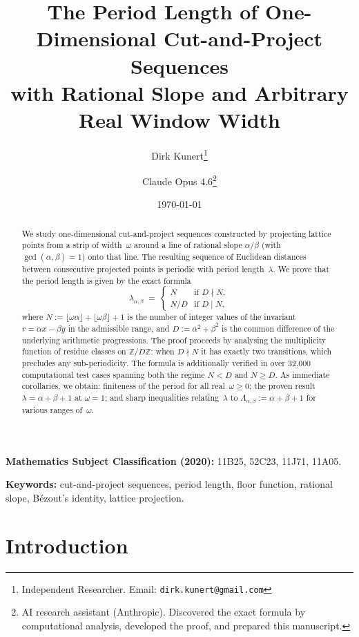 \documentclass[11pt]{article}
\title{The Period Length of One-Dimensional Cut-and-Project Sequences\\
with Rational Slope and Arbitrary Real Window Width}
\author{
    Dirk Kunert\thanks{Independent Researcher. Email: \texttt{dirk.kunert@gmail.com}}
    \and
    Claude Opus 4.6\thanks{AI research assistant (Anthropic). Discovered the exact
    formula by computational analysis, developed the proof,
    and prepared this manuscript.}
}
\date{\today}
\theoremstyle{plain}
\theoremstyle{definition}
\theoremstyle{remark}
\begin{document}
\maketitle

\begin{abstract}
We study one-dimensional cut-and-project sequences constructed by projecting
lattice points from a strip of width~$\omega$ around a line of rational slope
$\alpha/\beta$ (with $\gcd(\alpha,\beta)=1$) onto that line.
The resulting sequence of Euclidean distances between consecutive projected
points is periodic with period length~$\lambda$.
We prove that the period length is given by the exact formula
\[
    \lambda_{\alpha,\beta} \;=\;
    \begin{cases}
        N & \text{if } D \nmid N, \\[3pt]
        N / D & \text{if } D \mid N,
    \end{cases}
\]
where $N := \lfloor\omega\alpha\rfloor + \lfloor\omega\beta\rfloor + 1$ is
the number of integer values of the invariant $r = \alpha x - \beta y$ in the
admissible range, and $D := \alpha^2 + \beta^2$ is the common difference of
the underlying arithmetic progressions.
The proof proceeds by analysing the multiplicity function of residue
classes on $\mathbb{Z}/D\mathbb{Z}$: when $D \nmid N$ it has exactly two
transitions, which precludes any sub-periodicity.
The formula is additionally verified in over 32{,}000 computational test
cases spanning both the regime $N < D$ and $N \ge D$.
As immediate corollaries, we obtain: finiteness of the period for all
real~$\omega\ge 0$; the proven result $\lambda = \alpha + \beta + 1$ at
$\omega = 1$; and sharp inequalities relating~$\lambda$ to
$\Lambda_{\alpha,\beta} := \alpha + \beta + 1$ for various ranges of~$\omega$.
\end{abstract}

\medskip
\noindent\textbf{Mathematics Subject Classification (2020):}
11B25, 52C23, 11J71, 11A05.

\medskip
\noindent\textbf{Keywords:}
cut-and-project sequences, period length, floor function, rational slope,
B\'{e}zout's identity, lattice projection.

\section{Introduction}\label{sec:intro}
\end{document}
